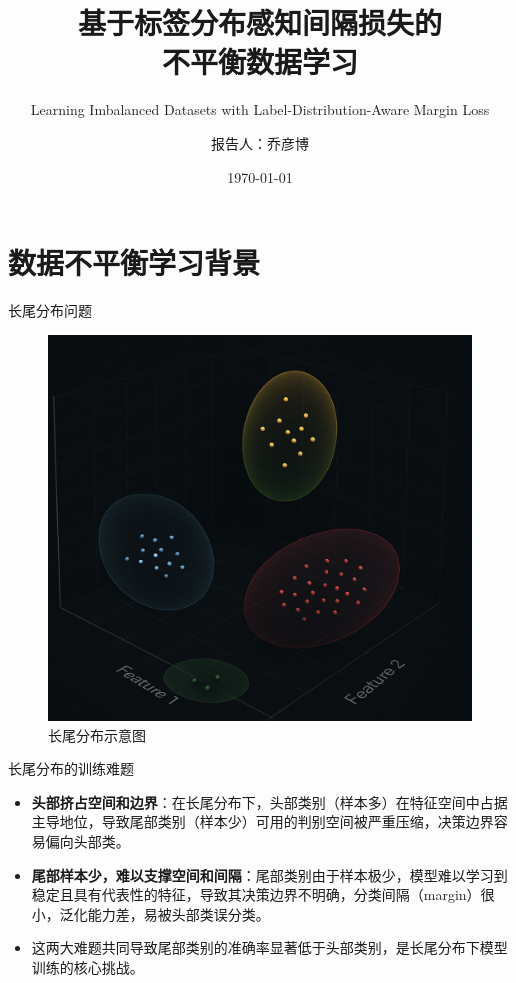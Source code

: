 \documentclass{beamer}
\title{基于标签分布感知间隔损失的\\不平衡数据学习}
\subtitle{Learning Imbalanced Datasets with Label-Distribution-Aware Margin Loss}
\author{报告人：乔彦博}
\institute{LDAM损失函数margin的推导证明}
\date{\today}
\begin{document}
\begin{frame}
    \titlepage
\end{frame}

\begin{frame}
\vspace{1em}
\begin{flushleft}
    \tableofcontents
\end{flushleft}
\end{frame}

\section{数据不平衡学习背景}
\begin{frame}{长尾分布问题}
    \begin{figure}[h]
        \centering
        \includegraphics[width=0.7\linewidth]{long-tail.png}
        \caption{长尾分布示意图}
    \end{figure}
\end{frame}
\begin{frame}{长尾分布的训练难题}
    \begin{itemize}
        \item \textbf{头部挤占空间和边界}：在长尾分布下，头部类别（样本多）在特征空间中占据主导地位，导致尾部类别（样本少）可用的判别空间被严重压缩，决策边界容易偏向头部类。
        \item \textbf{尾部样本少，难以支撑空间和间隔}：尾部类别由于样本极少，模型难以学习到稳定且具有代表性的特征，导致其决策边界不明确，分类间隔（margin）很小，泛化能力差，易被头部类误分类。
        \item 这两大难题共同导致尾部类别的准确率显著低于头部类别，是长尾分布下模型训练的核心挑战。
    \end{itemize}
\end{frame}
\end{document}
